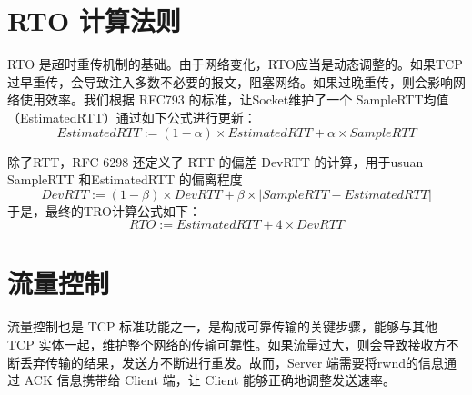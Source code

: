 \section{RTO 计算法则}

RTO 是超时重传机制的基础。由于网络变化，RTO应当是动态调整的。如果TCP 过早重传，会导致注入多数不必要的报文，阻塞网络。如果过晚重传，则会影响网络使用效率。我们根据 RFC793 的标准，让Socket维护了一个 SampleRTT均值（EstimatedRTT）通过如下公式进行更新：
\begin{equation}
    EstimatedRTT := (1-\alpha)\times EstimatedRTT + \alpha\times SampleRTT
\end{equation}\label{eq:est}

除了RTT，RFC 6298 还定义了 RTT 的偏差 DevRTT 的计算，用于usuan SampleRTT 和EstimatedRTT 的偏离程度
\begin{equation}
    DevRTT := (1-\beta)\times DevRTT + \beta\times|SampleRTT - EstimatedRTT|
\end{equation}
于是，最终的TRO计算公式如下：
\begin{equation}
    RTO := EstimatedRTT + 4\times DevRTT
\end{equation}\label{eq:rto}

\section{流量控制}

流量控制也是 TCP 标准功能之一，是构成可靠传输的关键步骤，能够与其他 TCP 实体一起，维护整个网络的传输可靠性。如果流量过大，则会导致接收方不断丢弃传输的结果，发送方不断进行重发。故而，Server 端需要将rwnd的信息通过 ACK 信息携带给 Client 端，让 Client 能够正确地调整发送速率。
